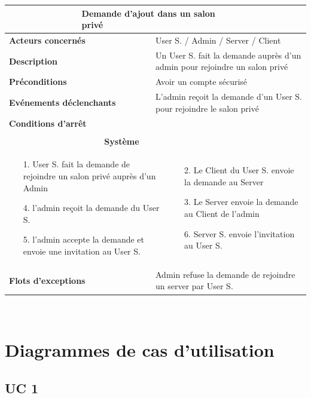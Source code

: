 \documentclass[a4paper,11pt,french]{article}
\newcommand{\fiche}[9] {
	\noindent
\begin{tabular}{|p{3.5cm}| p{1cm} | p{3cm} | p{.5cm} | p{7cm}|} 
\hline
\rowcolor{blue}
\multicolumn{2}{|l|}{\color{white}\bfseries{Nom}} & \multicolumn{3}{l|}{\color{white}\bfseries{#1}}\\
\hline
\multicolumn{2}{|l|}{\bfseries{Acteurs concernés}} & \multicolumn{3}{m{10.5cm}|}{#2}\\
\hline
\multicolumn{2}{|l|}{\bfseries{Description}} & \multicolumn{3}{m{10.5cm}|}{#3}\\
\hline
\multicolumn{2}{|l|}{\bfseries{Préconditions}} & \multicolumn{3}{m{10.5cm}|}{#4}\\
\hline
\multicolumn{2}{|l|}{\bfseries{Evénements déclenchants}} & \multicolumn{3}{m{10.5cm}|}{#5}\\
\hline
\multicolumn{2}{|l|}{\bfseries{Conditions d'arrêt}} & \multicolumn{3}{m{10.5cm}|}{#6}\\
\hline
\rowcolor{gray}
\multicolumn{5}{|c|}{\bfseries{Description du flot d'événements principal}}\\
\hline
\rowcolor{gray}
\multicolumn{3}{|c|}{\bfseries{Acteur(s)}} & \multicolumn{2}{c|}{\bfseries{Système}}\\
\hline
\multicolumn{3}{|p{7.5cm}|}{#7} & \multicolumn{2}{p{7.5cm}|}{#8}\\
\hline
\multicolumn{2}{|l}{\bfseries{Flots d'exceptions}} & \multicolumn{3}{|p{11.5cm}|}{#9}\\
\hline
\end{tabular}
\\
}
\begin{document}
\fiche
	{Demande d’ajout dans un salon privé} %
	{User S. / Admin / Server / Client} %
	{Un User S. fait la demande auprès d’un admin pour rejoindre un salon privé} %
	{Avoir un compte sécurisé} %
	{L’admin reçoit la demande d’un User S. pour rejoindre le salon privé} %
	{} %
	{\begin{itemize}  %
		\item [1.] User S. fait la demande de rejoindre un salon privé auprès d’un Admin
		\item []
		\item []
		\item [4.] l’admin reçoit la demande du User S.
		\item [5.] l'admin accepte  la demande et envoie une invitation au User S.
	 \end{itemize}
	} 
	{\begin{itemize}  %
		\item []
		\item [2.] Le Client du User S. envoie la demande au Server
		\item [3.] Le Server envoie la demande au Client de l’admin
		\item []
		\item []
		\item [6.] Server S. envoie l’invitation au User S.

	 \end{itemize}
	 }
	{Admin refuse la demande de rejoindre un server par User S.} %

\section{Diagrammes de cas d'utilisation}

\subsection{UC 1}


\end{document}
